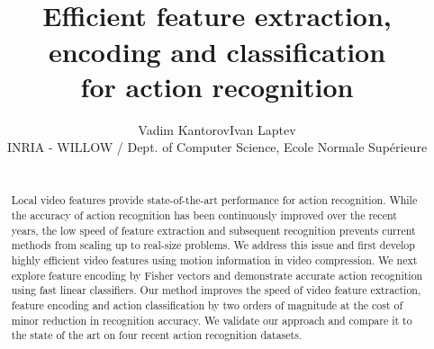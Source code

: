 \documentclass[10pt,twocolumn,letterpaper]{article}
\begin{document}

\title{\mbox{}\vspace{-1cm}\\Efficient feature extraction, encoding and classification\\ for action recognition\vspace{-.2cm}\\}

\author{Vadim Kantorov\qquad Ivan Laptev\\INRIA - WILLOW / Dept. of Computer Science, Ecole Normale Supérieure}

\maketitle

\begin{abstract}

\mbox{}\vspace{-.6cm}\\
Local video features provide state-of-the-art performance for action recognition. While the accuracy of action recognition has been continuously improved over the recent years, the low speed of feature extraction and subsequent recognition prevents current methods from scaling up to real-size problems. We address this issue and first develop highly efficient video features using motion information in video compression. We next explore feature encoding by Fisher vectors and demonstrate accurate action recognition using fast linear classifiers. Our method improves the speed of video feature extraction, feature encoding and action classification by two orders of magnitude at the cost of minor reduction in recognition accuracy. We validate our approach and compare it to the state of the art on four recent action recognition datasets.

\end{abstract}

%
%
\end{document}
